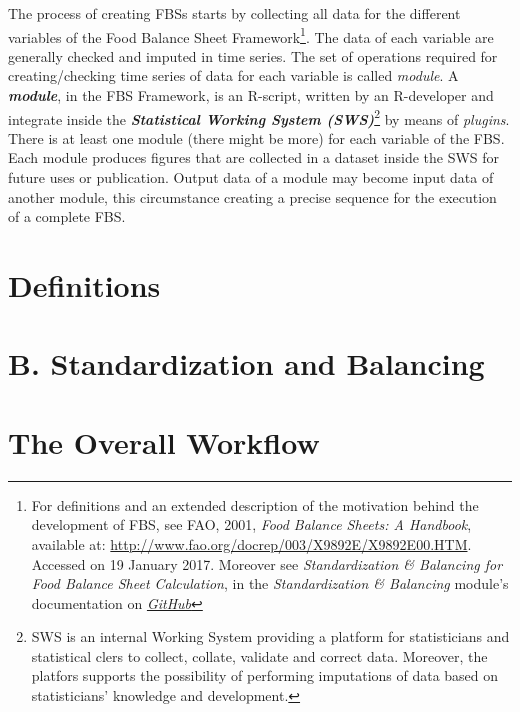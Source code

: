 \documentclass[]{article}
\let\rmarkdownfootnote\footnote%
\def\footnote{\protect\rmarkdownfootnote}
\begin{document}
The process of creating FBSs starts by collecting all data for the
different variables of the Food Balance Sheet Framework\footnote{For
  definitions and an extended description of the motivation behind the
  development of FBS, see FAO, 2001, \emph{Food Balance Sheets: A
  Handbook}, available at:
  \url{http://www.fao.org/docrep/003/X9892E/X9892E00.HTM}. Accessed on
  19 January 2017. Moreover see \emph{Standardization \& Balancing for
  Food Balance Sheet Calculation}, in the \emph{Standardization \&
  Balancing} module's documentation on
  \href{https://github.com/SWS-Methodology/faoswsStandardization/tree/master/documentation}{\emph{GitHub}}}.
The data of each variable are generally checked and imputed in time
series. The set of operations required for creating/checking time series
of data for each variable is called \emph{module}. A
\textbf{\emph{module}}, in the FBS Framework, is an R-script, written by
an R-developer and integrate inside the \textbf{\emph{Statistical
Working System (SWS)}}\footnote{SWS is an internal Working System
  providing a platform for statisticians and statistical clers to
  collect, collate, validate and correct data. Moreover, the platfors
  supports the possibility of performing imputations of data based on
  statisticians' knowledge and development.} by means of \emph{plugins}.
There is at least one module (there might be more) for each variable of
the FBS. Each module produces figures that are collected in a dataset
inside the SWS for future uses or publication. Output data of a module
may become input data of another module, this circumstance creating a
precise sequence for the execution of a complete FBS.

\section*{Definitions}\label{definitions}

\section*{B. Standardization and
Balancing}\label{b.-standardization-and-balancing}

\section{The Overall Workflow}\label{the-overall-workflow}
\end{document}

